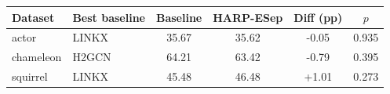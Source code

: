 \begin{tabular}{llcccc}
\toprule
Dataset & Best baseline & Baseline & HARP-ESep & Diff (pp) & $p$ \\
\midrule
actor & LINKX & 35.67 & 35.62 & -0.05 & 0.935 \\
chameleon & H2GCN & 64.21 & 63.42 & -0.79 & 0.395 \\
squirrel & LINKX & 45.48 & 46.48 & +1.01 & 0.273 \\
\bottomrule
\end{tabular}
